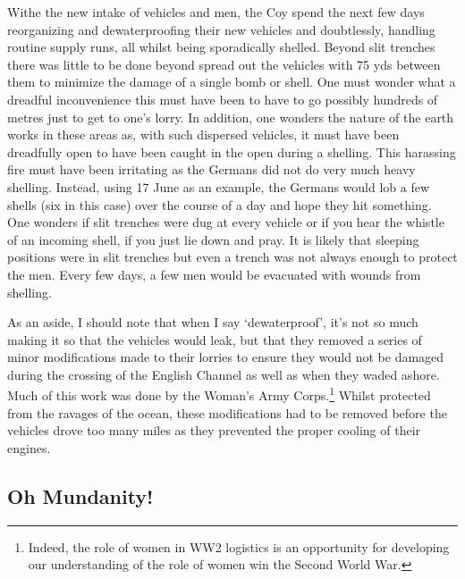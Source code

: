 \documentclass[noraggedright]{turabian-researchpaper}
\begin{document}
Withe the new intake of vehicles and men, the Coy spend the next few days
reorganizing and dewaterproofing their new vehicles and doubtlessly, handling
routine supply runs, all whilst being sporadically shelled.  Beyond slit 
trenches there was little to be done beyond spread out the vehicles with 75 yds
between them to minimize the damage of a single bomb or shell.  One must wonder
what a dreadful inconvenience this must have been to have to go possibly
hundreds of metres just to get to one's lorry.  In addition, one wonders the
nature of the earth works in these areas as, with such dispersed vehicles, it
must have been dreadfully open to have been caught in the open during a 
shelling.  This harassing fire must have been irritating as the Germans did 
not do very much heavy shelling.  Instead, using 17 June as an example, the
Germans would lob a few shells (six in this case) over the course of a day and 
hope they hit something.  One wonders if slit trenches were dug at every vehicle
or if you hear the whistle of an incoming shell, if you just lie down and 
pray.  It is likely that sleeping positions were in slit trenches but even a 
trench was not always enough to protect the men.  Every few days, a few men 
would be evacuated with wounds from shelling.

As an aside, I should 
note that when I say `dewaterproof', it's not so much making it so that the 
vehicles would leak, but that they removed a series of minor modifications 
made to their lorries to ensure they would not be damaged during the crossing 
of the English Channel as well as when they waded ashore.  Much of this work
was done by the Woman's Army Corps.\footnote{Indeed, the role of women in WW2 
logistics is an opportunity for developing our understanding of the role of
women win the Second World War.}   Whilst protected from the ravages of the 
ocean, these modifications had to be removed before the vehicles drove too 
many miles as they prevented the proper cooling of their engines.  



\subsection{Oh Mundanity!}
\end{document}
